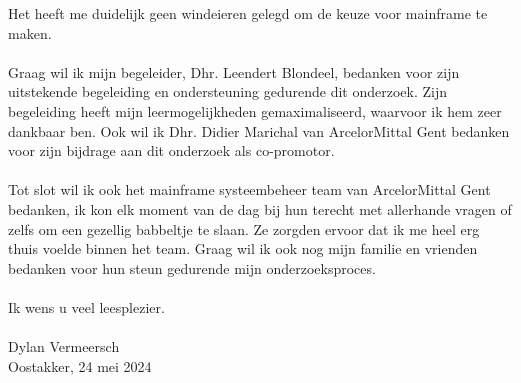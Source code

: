 Het heeft me duidelijk geen windeieren gelegd om de keuze voor mainframe te maken. 
\\ \\
Graag wil ik mijn begeleider, Dhr. Leendert Blondeel, bedanken voor zijn uitstekende begeleiding en ondersteuning gedurende dit onderzoek. 
Zijn begeleiding heeft mijn leermogelijkheden gemaximaliseerd, waarvoor ik hem zeer dankbaar ben. 
Ook wil ik Dhr. Didier Marichal van ArcelorMittal Gent bedanken voor zijn bijdrage aan dit onderzoek als co-promotor. 
\\ \\
Tot slot wil ik ook het mainframe systeembeheer team van ArcelorMittal Gent bedanken, ik kon elk moment van de dag bij hun terecht met allerhande vragen of zelfs om een gezellig babbeltje te slaan. 
Ze zorgden ervoor dat ik me heel erg thuis voelde binnen het team. 
Graag wil ik ook nog mijn familie en vrienden bedanken voor hun steun gedurende mijn onderzoeksproces. 
\\ \\
Ik wens u veel leesplezier.
\\ \\
Dylan Vermeersch
\\
Oostakker, 24 mei 2024